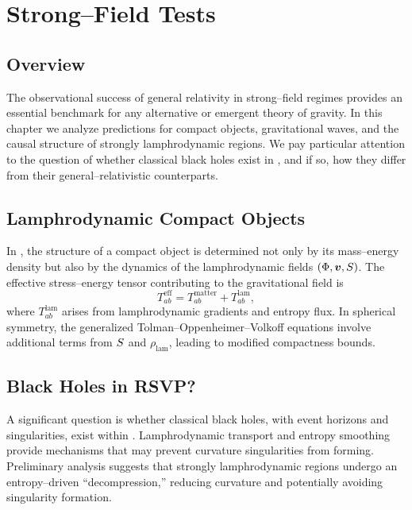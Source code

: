 
\chapter{Strong--Field Tests}
\label{chap:strong-field}

\section{Overview}

The observational success of general relativity in strong--field regimes
provides an essential benchmark for any alternative or emergent theory of
gravity. In this chapter we analyze \rsvpabbr{} predictions for compact
objects, gravitational waves, and the causal structure of strongly
lamphrodynamic regions. We pay particular attention to the question of
whether classical black holes exist in \rsvpabbr{}, and if so, how they
differ from their general--relativistic counterparts.

\section{Lamphrodynamic Compact Objects}

In \rsvpabbr{}, the structure of a compact object is determined not only by
its mass--energy density but also by the dynamics of the lamphrodynamic
fields $(\Phi,\bm{v},S)$. The effective stress--energy tensor
contributing to the gravitational field is
\begin{equation}
  T_{ab}^{\mathrm{eff}}
   = T_{ab}^{\mathrm{matter}}
     + T_{ab}^{\mathrm{lam}},
\end{equation}
where $T_{ab}^{\mathrm{lam}}$ arises from lamphrodynamic gradients and
entropy flux. In spherical symmetry, the generalized Tolman--Oppenheimer--Volkoff
equations involve additional terms from $S$ and $\rho_{\mathrm{lam}}$,
leading to modified compactness bounds.

\section{Black Holes in RSVP?}

A significant question is whether classical black holes, with event horizons
and singularities, exist within \rsvpabbr{}. Lamphrodynamic transport and
entropy smoothing provide mechanisms that may prevent curvature singularities
from forming. Preliminary analysis suggests that strongly lamphrodynamic
regions undergo an entropy--driven ``decompression,'' reducing curvature and
potentially avoiding singularity formation.

